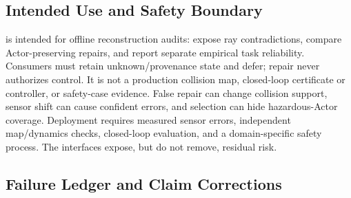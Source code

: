 \subsection{Intended Use and Safety Boundary}

\method is intended for offline reconstruction audits: expose ray contradictions, compare Actor-preserving repairs, and report
separate empirical task reliability. Consumers must retain unknown/provenance state and defer; repair never authorizes control. It is
not a production collision map, closed-loop certificate or controller, or safety-case evidence. False repair can change collision
support, sensor shift can cause confident errors, and selection can hide hazardous-Actor coverage. Deployment requires measured
sensor errors, independent map/dynamics checks, closed-loop evaluation, and a domain-specific safety process. The interfaces expose,
but do not remove, residual risk.

\clearpage
\onecolumn
\clearpage
\subsection{Failure Ledger and Claim Corrections}

